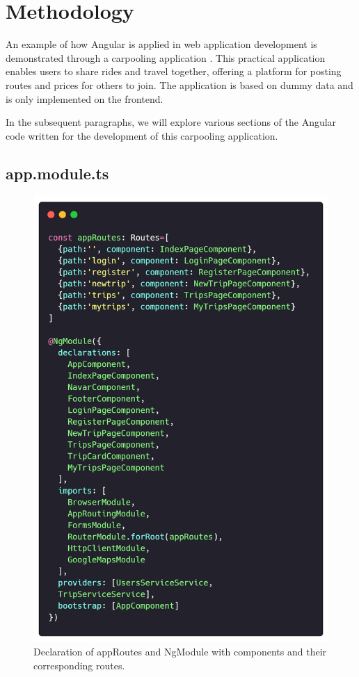 \documentclass{article}
\begin{document}
\section{Methodology}  \label{sec:methodology}

An example of how Angular is applied in web application development is demonstrated through a carpooling application \cite{caridaCode}. This practical application enables users to share rides and travel together, offering a platform for posting routes and prices for others to join. The application is based on dummy data and is only implemented on the frontend.

In the subsequent paragraphs, we will explore various sections of the Angular code written for the development of this carpooling application.

\subsection*{app.module.ts}

\begin{figure}[h]
  \centering
  \includegraphics[width=0.9\columnwidth]{figures/app.module.ts.png}
  \caption{Declaration of appRoutes and NgModule with components and their corresponding routes.\label{fig:app.module.ts}}
  \end{figure}
\end{document}
